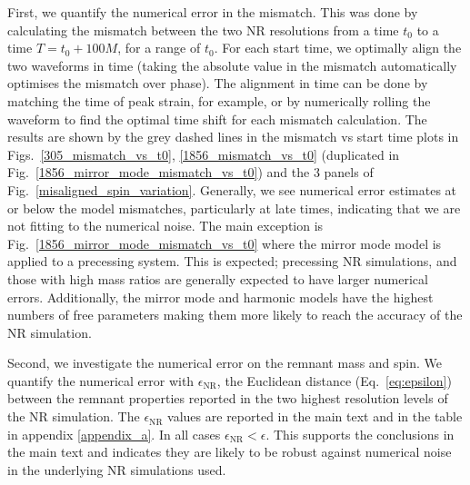 First, we quantify the numerical error in the mismatch.
This was done by calculating the mismatch between the two NR resolutions from a time $t_0$ to a time $T = t_0 + 100M$, for a range of $t_0$. For each start time, we optimally align the two waveforms in time (taking the absolute value in the mismatch automatically optimises the mismatch over phase). The alignment in time can be done by matching the time of peak strain, for example, or by numerically rolling the waveform to find the optimal time shift for each mismatch calculation.
The results are shown by the grey dashed lines in the mismatch vs start time plots in Figs.~\ref{305_mismatch_vs_t0}, \ref{1856_mismatch_vs_t0} (duplicated in Fig.~\ref{1856_mirror_mode_mismatch_vs_t0}) and the 3 panels of Fig.~\ref{misaligned_spin_variation}.
Generally, we see numerical error estimates at or below the model mismatches, particularly at late times, indicating that we are not fitting to the numerical noise.
The main exception is Fig.~\ref{1856_mirror_mode_mismatch_vs_t0} where the mirror mode model is applied to a precessing system. This is expected; precessing NR simulations, and those with high mass ratios are generally expected to have larger numerical errors. Additionally, the mirror mode and harmonic models have the highest numbers of free parameters making them more likely to reach the accuracy of the NR simulation. 

Second, we investigate the numerical error on the remnant mass and spin.
We quantify the numerical error with $\epsilon_{\mathrm{NR}}$, the Euclidean distance (Eq.~\ref{eq:epsilon}) between the remnant properties reported in the two highest resolution levels of the NR simulation.
The $\epsilon_{\mathrm{NR}}$ values are reported in the main text and in the table in appendix \ref{appendix_a}.
In all cases $\epsilon_{\mathrm{NR}} < \epsilon$. This supports the conclusions in the main text and indicates they are likely to be robust against numerical noise in the underlying NR simulations used.